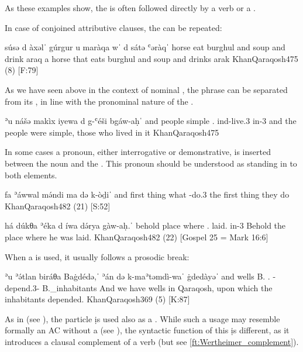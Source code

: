 As these examples show, the \lnk* is often followed directly by a verb or a .

In case of conjoined attributive clauses, the \lnk*  can be repeated:

{súsə d\cb{} àxəlˈ gúrgur\cb{} u maràqa \cb{}wˈ d\cb{} sátə ʿəràqˈ}
{horse \lnk\cb{} eat burghul\cb{} and soup \cb{}and \lnk\cb{} drink araq}
{a horse that eats burghul and soup and drinks arak}
{KhanQaraqosh}{475 (8) {[F:79]}}
	
As we have seen above in the context of nominal \secns, the \lnk* phrase can be separated from its \prim, in line with the pronominal nature of the \lnk*.



{ʾu\cb{} nášə makìx\cb{} iyewa d\cb{} g-ʿéši bgáw-aḥˈ}
{and\cb{} people simple\cb{} \cop.\pst{} \lnk\cb{} ind-live.3\pl{} in-3\fem}
{and the people were simple, those who lived in it}
{KhanQaraqosh}{475}

In some cases a pronoun, either interrogative or demonstrative, is inserted between the \prim noun and the \lnk*. This pronoun should be understood as standing in  to both elements.

{fa\cb{}  ʾáwwal mə́ndi ma\cb{}  də\cb{}  k-òḏiˈ}
	{and\cb{}  first thing what\cb{}  \lnk\cb{}  \ind-do.3\pl}
{the first thing they do}
{KhanQaraqosh}{482 (21) {[S:52]}}

{há dúkθa ʾéka d\cb{}  íwa də́rya gàw-aḥ.ˈ}
{behold place where \lnk\cb{}  \cop.\pst{} laid.\resl{} in-3\fem}
{Behold the place where he was laid.}
{KhanQaraqosh}{482 (22) {[Gospel 25 = Mark 16:6]}}

When a  is used, it usually follows a prosodic break:

{ʾu\cb{}  ʾə́tlan biráθa Baġdédə,ˈ ʾán də\cb{}  k-maʾtəmdì-waˈ ġdedàyəˈ}
{and\cb{}  \pl{} wells B. \dem.\pl{} \lnk\cb{}  \ind-depend.3\pl-\pst{} B.\_inhabitants}
{And we have wells in Qaraqosh, upon which the inhabitants depended.}
{KhanQaraqosh}{369 (5) {[K:87]}}


As in \Syr (see ), the particle \d is used also as a . While such a usage may resemble formally an AC without a \prim (see ), the syntactic function of this \d is different, as it introduces a clausal complement of a verb (but see \vref{ft:Wertheimer_complement}).

